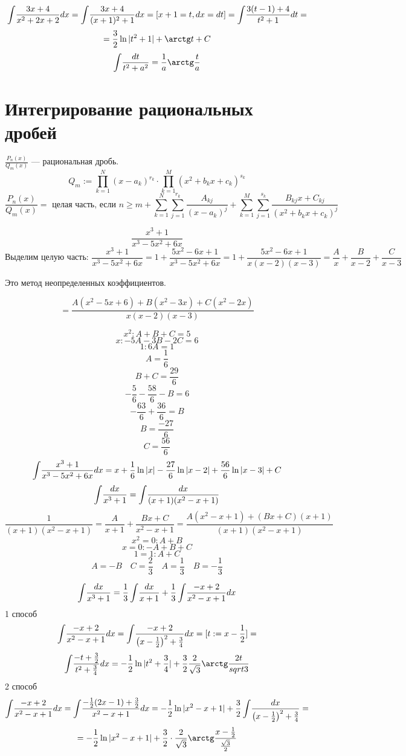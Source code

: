 $$\int\! \frac{3x+4}{x^2+2x+2}dx=\int\!\frac{3x+4}{(x+1)^2+1}dx=[x+1=t, dx=dt]=\int\!\frac{3(t-1)+4}{t^2+1}dt=$$
$$=\frac{3}{2}\ln|t^2+1|+\arctg t + C$$
$$\intt \frac{dt}{t^2+a^2}=\frac{1}{a}\arctg\frac{t}{a}$$

\section{Интегрирование рациональных дробей}

$\frac{P_n(x)}{Q_m(x)}$ --- рациональная дробь.
$$Q_m:=\prod\limits_{k=1}^N(x-a_k)^{r_k}\cdot \prod\limits_{k=1}^M(x^2+b_kx+c_k)^{s_k}$$
$$\frac{P_n(x)}{Q_m(x)}=\text{ целая часть, если } n\geq m + \sum\limits_{k=1}^{N}\sum\limits_{j=1}^{r_k} \frac{A_{kj}}{(x-a_k)^j} + \sum\limits_{k=1}^{M}\sum\limits_{j=1}^{s_k} \frac{B_{kj}x+C_{kj}}{(x^2+b_kx+c_k)^j}$$

$$\frac{x^3+1}{x^3-5x^2+6x}$$
$$\text{Выделим целую часть: } \frac{x^3+1}{x^3-5x^2+6x}=1+\frac{5x^2-6x+1}{x^3-5x^2+6x}=1+\frac{5x^2-6x+1}{x(x-2)(x-3)}=\frac{A}{x}+\frac{B}{x-2}+\frac{C}{x-3}$$

Это метод неопределенных коэффициентов.

$$=\frac{A(x^2-5x+6)+B(x^2-3x)+C(x^2-2x)}{x(x-2)(x-3)}$$

$$x^2: A+B+C=5$$
$$x: -5A-3B-2C=6$$
$$1: 6A=1$$
$$A=\frac{1}{6}$$
$$B+C=\frac{29}{6}$$
$$-\frac{5}{6}-\frac{58}{6}-B=6$$
$$-\frac{63}{6}+\frac{36}{6}=B$$
$$B=\frac{-27}{6}$$
$$C=\frac{56}{6}$$
$$\int\! \frac{x^3+1}{x^3-5x^2+6x} dx = x + \frac{1}{6} \ln|x|-\frac{27}{6}\ln|x-2|+\frac{56}{6}\ln|x-3|+C$$
$$\int\! \frac{dx}{x^3+1}=\int\! \frac{dx}{(x+1)(x^2-x+1)}$$
$$\frac{1}{(x+1)(x^2-x+1)}=\frac{A}{x+1}+\frac{Bx+C}{x^2-x+1}=\frac{A(x^2-x+1)+(Bx+C)(x+1)}{(x+1)(x^2-x+1)}$$
$$x^2=0: A+B$$
$$x=0: -A+B+C$$
$$1=1: A+C$$
$$A=-B \quad C = \frac{2}{3} \quad A = \frac{1}{3} \quad B=-\frac{1}{3}$$

$$\int\! \frac{dx}{x^3+1}=\frac{1}{3}\int\!\frac{dx}{x+1}+\frac{1}{3}\int\!\frac{-x+2}{x^2-x+1}dx$$
1 способ
$$\int\!\frac{-x+2}{x^2-x+1}dx=\int\!\frac{-x+2}{\left(x-\frac{1}{2}\right)^2+\frac{3}{4}}dx=[t:=x-\frac{1}{2}]=$$
$$\intt\frac{-t+\frac{3}{2}}{t^2+\frac{3}{4}}dx=-\frac{1}{2}\ln|t^2+\frac{3}{4}|+\frac{3}{2}\frac{2}{\sqrt 3}\arctg \frac{2t}{sqrt 3}$$
2 способ
$$\int\!\frac{-x+2}{x^2-x+1}dx=\int\!\frac{-\frac{1}{2}(2x-1)+\frac{3}{2}}{x^2-x+1}dx=-\frac{1}{2}\ln|x^2-x+1|+\frac{3}{2}\int\!\frac{dx}{\left(x-\frac{1}{2}\right)^2+\frac{3}{4}}=$$
$$=-\frac{1}{2}\ln|x^2-x+1|+\frac{3}{2}\cdot\frac{2}{\sqrt 3}\arctg\frac{x-\frac{1}{2}}{\frac{\sqrt 3}{2}}$$

